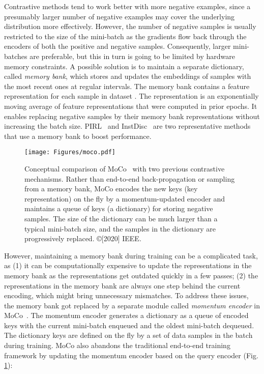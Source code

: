 \documentclass[lettersize,journal]{IEEEtran}
\begin{document}
Contrastive methods tend to work better with more negative examples, since a presumably larger number of negative examples may cover the underlying distribution more effectively. However, the number of negative samples is usually restricted to the size of the mini-batch as the gradients flow back through the encoders of both the positive and negative samples. Consequently, larger mini-batches are preferable, but this in turn is going to be limited by hardware memory constraints. A possible solution is to maintain a separate dictionary, called \textit{memory bank}, which stores and updates the embeddings of samples with the most recent ones at regular intervals. The memory bank contains a feature representation  for each sample  in dataset . The representation  is an exponentially moving average of feature representations that were computed in prior epochs. It enables replacing negative samples  by their memory bank representations without increasing the batch size. PIRL~\cite{misra2020self} and InstDisc~\cite{wu2018unsupervised} are two representative methods that use a memory bank to boost performance. 

\begin{figure}
\centering
\texttt{[image: Figures/moco.pdf]}
\caption[moco]{Conceptual comparison of MoCo~\cite{he2020momentum} with two previous contrastive mechanisms. Rather than end-to-end back-propagation or sampling from a memory bank, MoCo encodes the new keys (key representation) on the fly by a momentum-updated encoder and maintains a queue of keys (a dictionary) for storing negative samples. The size of the dictionary can be much larger than a typical mini-batch size, and the samples in the dictionary are progressively replaced. ©[2020] IEEE.}
\label{fig:moco}
\end{figure}

However, maintaining a memory bank during training can be a complicated task, as (1) it can be computationally expensive to update the representations in the memory bank as the representations get outdated quickly in a few passes; (2) the representations in the memory bank are always one step behind the current encoding, which might bring unnecessary mismatches. To address these issues, the memory bank got replaced by a separate module called \textit{momentum encoder} in MoCo~\cite{he2020momentum}. The momentum encoder generates a dictionary as a queue of encoded keys with the current mini-batch enqueued and the oldest mini-batch dequeued. The dictionary keys are defined on the fly by a set of data samples in the batch during training. MoCo also abandons the traditional end-to-end training framework by updating the momentum encoder based on the query encoder (Fig. \ref{fig:moco}):
\end{document}
